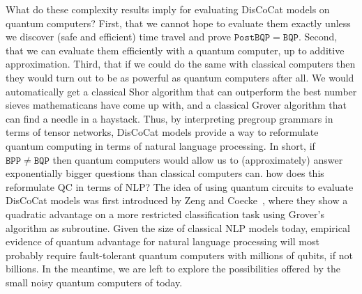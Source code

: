 What do these complexity results imply for evaluating DisCoCat models on quantum computers?
First, that we cannot hope to evaluate them exactly unless we discover (safe and efficient) time travel and prove $\mathtt{PostBQP} = \mathtt{BQP}$.
Second, that we can evaluate them efficiently with a quantum computer, up to additive approximation.
Third, that if we could do the same with classical computers then they would turn out to be as powerful as quantum computers after all.
We would automatically get a classical Shor algorithm that can outperform the best number sieves mathematicans have come up with, and a classical Grover algorithm that can find a needle in a haystack.
Thus, by interpreting pregroup grammars in terms of tensor networks, DisCoCat models provide a way to reformulate quantum computing in terms of natural language processing.
In short, if $\mathtt{BPP} \neq \mathtt{BQP}$ then quantum computers would allow us to (approximately) answer exponentially bigger questions than classical computers can.
{\blue how does this reformulate QC in terms of NLP?}
The idea of using quantum circuits to evaluate DisCoCat models was first introduced by Zeng and Coecke~\cite{ZengCoecke16}, where they show a quadratic advantage on a more restricted classification task using Grover's algorithm as subroutine.
Given the size of classical NLP models today, empirical evidence of quantum advantage for natural language processing will most probably require fault-tolerant quantum computers with millions of qubits, if not billions.
In the meantime, we are left to explore the possibilities offered by the small noisy quantum computers of today.
